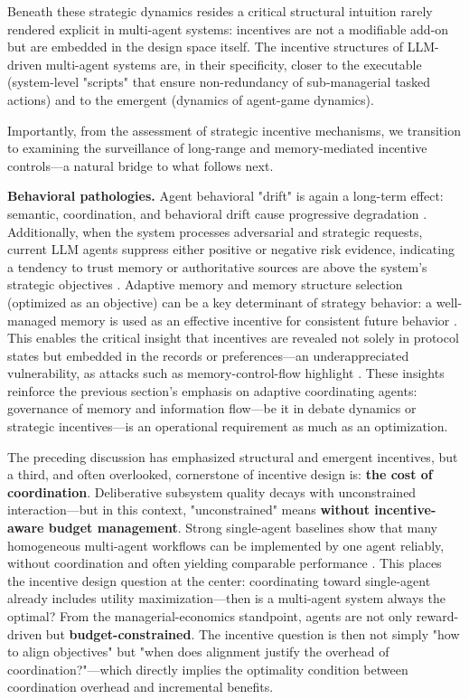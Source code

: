\documentclass[11pt,a4paper]{article}
\begin{document}
Beneath these strategic dynamics resides a critical structural intuition rarely rendered explicit in multi-agent systems: incentives are not a modifiable add-on but are embedded in the design space itself. The incentive structures of LLM-driven multi-agent systems are, in their specificity, closer to the executable (system-level "scripts" that ensure non-redundancy of sub-managerial tasked actions) and to the emergent (dynamics of agent-game dynamics).

Importantly, from the assessment of strategic incentive mechanisms, we transition to examining the surveillance of long-range and memory-mediated incentive controls---a natural bridge to what follows next.

\textbf{Behavioral pathologies.}
Agent behavioral "drift" is again a long-term effect: semantic, coordination, and behavioral drift cause progressive degradation \cite{arxiv:2601.04170v1}. Additionally, when the system processes adversarial and strategic requests, current LLM agents suppress either positive or negative risk evidence, indicating a tendency to trust memory or authoritative sources are above the system's strategic objectives \cite{arxiv:2510.02373v1}. Adaptive memory and memory structure selection (optimized as an objective) can be a key determinant of strategy behavior: a well-managed memory is used as an effective incentive for consistent future behavior \cite{arxiv:2505.16067v2,arxiv:2505.16067v2}. This enables the critical insight that incentives are revealed not solely in protocol states but embedded in the records or preferences---an underappreciated vulnerability, as attacks such as memory-control-flow highlight \cite{arxiv:2603.15125v3}. These insights reinforce the previous section's emphasis on adaptive coordinating agents: governance of memory and information flow---be it in debate dynamics or strategic incentives---is an operational requirement as much as an optimization.

The preceding discussion has emphasized structural and emergent incentives, but a third, and often overlooked, cornerstone of incentive design is: \textbf{the cost of coordination}. Deliberative subsystem quality decays with unconstrained interaction---but in this context, "unconstrained" means \textbf{without incentive-aware budget management}. Strong single-agent baselines show that many homogeneous multi-agent workflows can be implemented by one agent reliably, without coordination and often yielding comparable performance \cite{arxiv:2601.12307v1}. This places the incentive design question at the center: coordinating toward single-agent already includes utility maximization---then is a multi-agent system always the optimal? From the managerial-economics standpoint, agents are not only reward-driven but \textbf{budget-constrained}. The incentive question is then not simply "how to align objectives" but "when does alignment justify the overhead of coordination?"---which directly implies the optimality condition between coordination overhead and incremental benefits.
\end{document}
